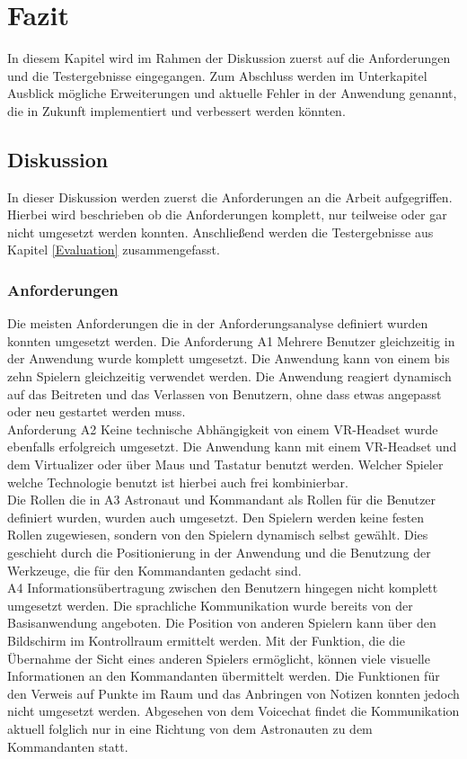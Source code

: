 \section{Fazit}
In diesem Kapitel wird im Rahmen der Diskussion zuerst auf die Anforderungen und die Testergebnisse eingegangen. Zum Abschluss werden im Unterkapitel Ausblick mögliche Erweiterungen und aktuelle Fehler in der Anwendung genannt, die in Zukunft implementiert und verbessert werden könnten.

\subsection{Diskussion} \label{Diskussion}
In dieser Diskussion werden zuerst die Anforderungen an die Arbeit aufgegriffen. Hierbei wird beschrieben ob die Anforderungen komplett, nur teilweise oder gar nicht umgesetzt werden konnten. Anschließend werden die Testergebnisse aus Kapitel \ref{Evaluation} zusammengefasst.

\subsubsection{Anforderungen}
Die meisten Anforderungen die in der Anforderungsanalyse definiert wurden konnten umgesetzt werden. Die Anforderung A1 \glqq Mehrere Benutzer gleichzeitig in der Anwendung\grqq{} wurde komplett umgesetzt. Die Anwendung kann von einem bis zehn Spielern gleichzeitig verwendet werden. Die Anwendung reagiert dynamisch auf das Beitreten und das Verlassen von Benutzern, ohne dass etwas angepasst oder neu gestartet werden muss.\\
Anforderung A2 \glqq Keine technische Abhängigkeit von einem VR-Headset\grqq{} wurde ebenfalls erfolgreich umgesetzt. Die Anwendung kann mit einem VR-Headset und dem Virtualizer oder über Maus und Tastatur benutzt werden. Welcher Spieler welche Technologie benutzt ist hierbei auch frei kombinierbar.\\
Die Rollen die in A3 \glqq Astronaut und Kommandant als Rollen für die Benutzer\grqq{} definiert wurden, wurden auch umgesetzt. Den Spielern werden keine festen Rollen zugewiesen, sondern von den Spielern dynamisch selbst gewählt. Dies geschieht durch die Positionierung in der Anwendung und die Benutzung der Werkzeuge, die für den Kommandanten gedacht sind.\\

A4 \glqq Informationsübertragung zwischen den Benutzern\grqq{} hingegen nicht komplett umgesetzt werden. Die sprachliche Kommunikation wurde bereits von der Basisanwendung angeboten. Die Position von anderen Spielern kann über den Bildschirm im Kontrollraum ermittelt werden. Mit der Funktion, die die Übernahme der Sicht eines anderen Spielers ermöglicht, können viele visuelle Informationen an den Kommandanten übermittelt werden. Die Funktionen für den Verweis auf Punkte im Raum und das Anbringen von Notizen konnten jedoch nicht umgesetzt werden. Abgesehen von dem Voicechat findet die Kommunikation aktuell folglich nur in eine Richtung von dem Astronauten zu dem Kommandanten statt.\\


